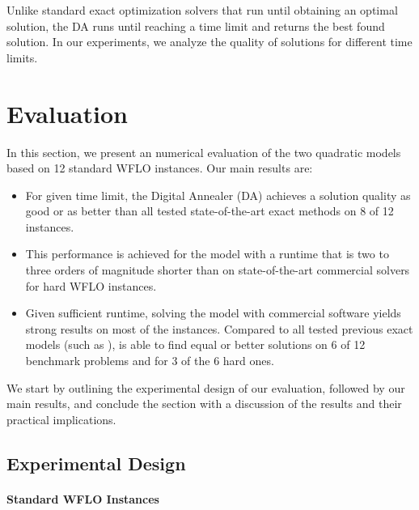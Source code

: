 \documentclass[preprint,12pt]{elsarticle}
\newcommand{\todo}[1]{{\textcolor{red}{\bf {#1}}}}
\newcommand{\qcls}{{\sf {\small QC-LS\xspace}}}
\newcommand{\quls}{{\sf {\small QU-LS\xspace}}}
\newcommand{\qcss}{{\sf {\small QC-SS\xspace}}}
\newcommand{\qcssgrb}{{\sf {\small QC-SS(GRB)\xspace}}}
\begin{document}
Unlike %
standard exact optimization solvers that run until obtaining an optimal solution, the DA runs until reaching a time limit and returns the best found solution.  In our experiments, we analyze the quality of solutions for different time limits.



\section{Evaluation}
\label{sec:eval}

In this section, we 
present an numerical evaluation of the two quadratic models based on 
12 standard WFLO instances.
Our main results are: \begin{itemize}
	\item For given time limit, the Digital Annealer (DA) achieves a solution quality as good or as better than all tested state-of-the-art exact methods on 8 of 12 instances.
	\item This performance is achieved for the \quls{} model with a runtime that is two to three orders of magnitude shorter than \qcls{} on state-of-the-art commercial solvers for hard WFLO instances.
	\item Given sufficient runtime, solving the \qcls{} model with commercial software yields strong results on most of the instances. Compared to all tested previous exact models (such as \qcss), \qcls{} is able to find equal or better solutions on 6 of 12 benchmark problems and for 3 of the 6 hard ones. %
\end{itemize}

We start by outlining the experimental design of our evaluation, followed by our main results,
and conclude the section with a discussion of the results and their practical implications.

\subsection{Experimental Design}



\paragraph{Standard WFLO Instances}
\end{document}
